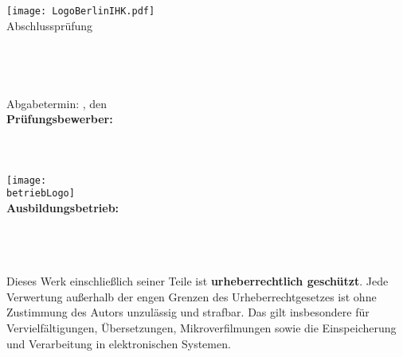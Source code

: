 \begin{titlepage}

    \begin{center}
    \texttt{[image: LogoBerlinIHK.pdf]}\\[1ex]
    \Large{Abschlussprüfung \pruefungstermin}\\[3ex]
    
    \Large{\ausbildungsberuf}\\
    \LARGE{\betreff}\\[4ex]
    
    \huge{\textbf{\titel}}\\[1.5ex]
    \Large{\textbf{\untertitel}}\\[4ex]
    
    \normalsize
    Abgabetermin: \abgabeOrt, den \abgabeTermin\\[3em]
    \textbf{Prüfungsbewerber:}\\
    \autorName\\
    \autorAnschrift\\
    \autorOrt\\[5ex]
    
    \texttt{[image: \\betriebLogo]}\\[2ex]
    \textbf{Ausbildungsbetrieb:}\\
    \betriebName\\
    \betriebAnschrift\\
    \betriebOrt\\[5em]
    \end{center}
    
    \small
    \noindent
    Dieses Werk einschließlich seiner Teile ist \textbf{urheberrechtlich geschützt}.
    Jede Verwertung außerhalb der engen Grenzen des Urheberrechtgesetzes ist ohne
    Zustimmung des Autors unzulässig und strafbar. Das gilt insbesondere für
    Vervielfältigungen, Übersetzungen, Mikroverfilmungen sowie die Einspeicherung
    und Verarbeitung in elektronischen Systemen.
    
    \end{titlepage}
